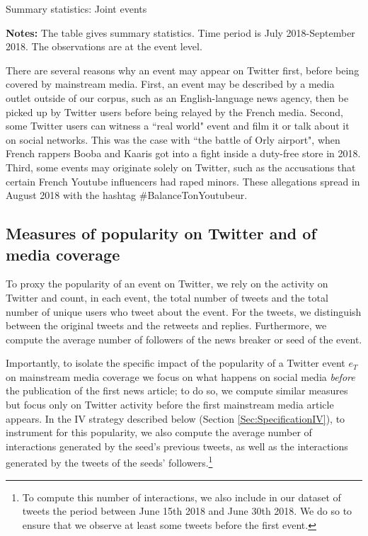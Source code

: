 \begin{table}
\caption{Summary statistics: Joint events\label{Tab:table_summary_joint_events}}
\begin{center}

\end{center}
\begin{spacing}{0.5}
{\fns \textbf{Notes:} The table gives summary statistics. Time period is July 2018-September 2018. The observations are at the event level.}
\end{spacing}
\end{table} 



There are several reasons why an event may appear on Twitter first, before being covered by mainstream media. First, an event may be described by a media outlet outside of our corpus, such as an English-language news agency, then be picked up by Twitter users before being relayed by the French media. Second, some Twitter users can witness a ``real world" event and film it or talk about it on social networks. This was the case with ``the battle of Orly airport", when French rappers Booba and Kaaris got into a fight inside a duty-free store in 2018. Third, some events may originate solely on Twitter, such as the accusations that certain French Youtube influencers had raped minors. These allegations spread in August 2018 with the hashtag \#BalanceTonYoutubeur.



\subsection{Measures of popularity on Twitter and of media coverage}

To proxy the popularity of an event on Twitter, we rely on the activity on Twitter and count, in each event, the total number of tweets and the total number of unique users who tweet about the event. For the tweets, we distinguish between the original tweets and the retweets and replies. Furthermore, we compute the average number of followers of the news breaker or seed of the event.

Importantly, to isolate the specific impact of the popularity of a Twitter event $e_T$ on mainstream media coverage we focus on what happens on social media \textit{before} the publication of the first news article; to do so, we compute similar measures but focus only on Twitter activity before the first mainstream media article appears. In the IV strategy described below (Section \ref{Sec:SpecificationIV}), to instrument for this popularity, we also compute the average number of interactions generated by the seed's previous tweets, as well as the interactions generated by the tweets of the seeds' followers.\footnote{To compute this number of interactions, we also include in our dataset of tweets the period between June 15th 2018 and June 30th 2018. We do so to ensure that we observe at least some tweets before the first event.} 


